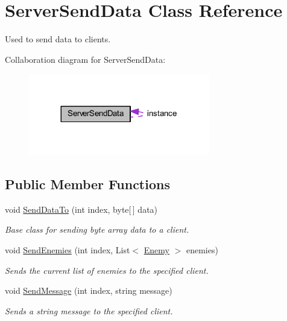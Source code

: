\hypertarget{class_server_send_data}{}\section{Server\+Send\+Data Class Reference}
\label{class_server_send_data}


Used to send data to clients.  




Collaboration diagram for Server\+Send\+Data\+:\nopagebreak
\begin{figure}[H]
\begin{center}
\leavevmode
\includegraphics[width=224pt]{class_server_send_data__coll__graph}
\end{center}
\end{figure}
\subsection*{Public Member Functions}
\begin{DoxyCompactItemize}
\item 
void \mbox{\hyperlink{class_server_send_data_a7fb6d84bdffbfca0424dd92841988a9c}{Send\+Data\+To}} (int index, byte\mbox{[}$\,$\mbox{]} data)
\begin{DoxyCompactList}\small\item\em Base class for sending byte array data to a client. \end{DoxyCompactList}\item 
void \mbox{\hyperlink{class_server_send_data_ae281214f153a330d64faa820ff55c3b7}{Send\+Enemies}} (int index, List$<$ \mbox{\hyperlink{class_enemy}{Enemy}} $>$ enemies)
\begin{DoxyCompactList}\small\item\em Sends the current list of enemies to the specified client. \end{DoxyCompactList}\item 
void \mbox{\hyperlink{class_server_send_data_a360f11f9f0c66245d98ee14a6da70218}{Send\+Message}} (int index, string message)
\begin{DoxyCompactList}\small\item\em Sends a string message to the specified client. \end{DoxyCompactList}\end{DoxyCompactItemize}
